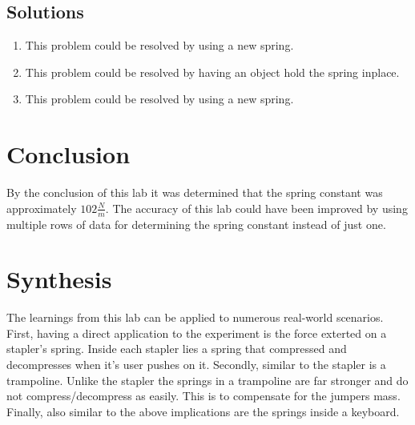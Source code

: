 \documentclass{article}
\begin{document}
\subsection*{Solutions}
\begin{enumerate}
    \item {This problem could be resolved by using a new spring.}
    \item {This problem could be resolved by having an object hold the spring inplace.}
    \item {This problem could be resolved by using a new spring.}
\end{enumerate}\leavevmode

\section*{Conclusion}
By the conclusion of this lab it was determined that the spring constant was approximately $102\frac{N}{m}$.
The accuracy of this lab could have been improved by using multiple rows of data for determining the spring constant instead of just one.

\section*{Synthesis}
The learnings from this lab can be applied to numerous real-world scenarios.
First, having a direct application to the experiment is the force exterted on a stapler's spring. Inside each stapler lies a spring that compressed and decompresses when it's user pushes on it.
Secondly, similar to the stapler is a trampoline. Unlike the stapler the springs in a trampoline are far stronger and do not compress/decompress as easily. This is to compensate for the jumpers mass.
Finally, also similar to the above implications are the springs inside a keyboard.
\end{document}
